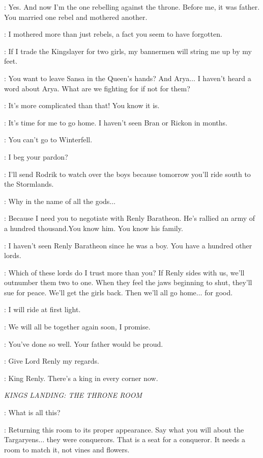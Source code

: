 \ROBB: Yes. And now I'm the one rebelling against the throne. Before me, it was father. You married one rebel and mothered another.

\CATELYN: I mothered more than just rebels, a fact you seem to have forgotten.

\ROBB: If I trade the Kingslayer for two girls, my bannermen will string me up by my feet.

\CATELYN: You want to leave Sansa in the Queen's hands? And Arya$\ldots$ I haven't heard a word about Arya. What are we fighting for if not for them?

\ROBB: It's more complicated than that! You know it is.

\CATELYN: It's time for me to go home. I haven't seen Bran or Rickon in months.

\ROBB: You can't go to Winterfell.

\CATELYN: I beg your pardon?

\ROBB: I'll send Rodrik to watch over the boys because tomorrow you'll ride south to the Stormlands.

\CATELYN: Why in the name of all the gods$\ldots$

\ROBB: Because I need you to negotiate with Renly Baratheon. He's rallied an army of a hundred thousand.You know him. You know his family.

\CATELYN: I haven't seen Renly Baratheon since he was a boy. You have a hundred other lords.

\ROBB: Which of these lords do I trust more than you? If Renly sides with us, we'll outnumber them two to one. When they feel the jaws beginning to shut, they'll sue for peace. We'll get the girls back. Then we'll all go home$\ldots$ for good.

\CATELYN: I will ride at first light.

\ROBB: We will all be together again soon, I promise.

\CATELYN: You've done so well. Your father would be proud.

\ROBB: Give Lord Renly my regards.

\CATELYN: King Renly. There's a king in every corner now.


\scene

\textit{KINGS LANDING: THE THRONE ROOM}


\CERSEI: What is all this?

\JOFFREY: Returning this room to its proper appearance. Say what you will about the Targaryens$\ldots$ they were conquerors. That is a seat for a conqueror. It needs a room to match it, not vines and flowers.

